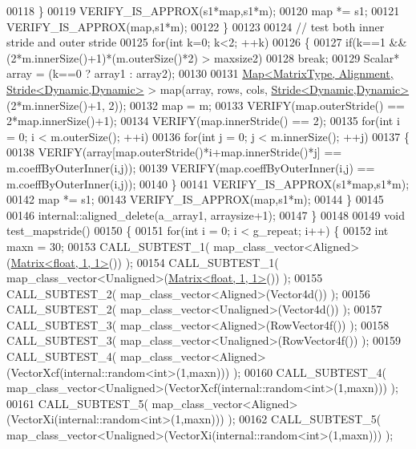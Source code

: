 \begin{DoxyCode}
00118       \}
00119     VERIFY\_IS\_APPROX(s1*map,s1*m);
00120     map *= s1;
00121     VERIFY\_IS\_APPROX(map,s1*m);
00122   \}
00123 
00124   \textcolor{comment}{// test both inner stride and outer stride}
00125   \textcolor{keywordflow}{for}(\textcolor{keywordtype}{int} k=0; k<2; ++k)
00126   \{
00127     \textcolor{keywordflow}{if}(k==1 && (2*m.innerSize()+1)*(m.outerSize()*2) > maxsize2)
00128       \textcolor{keywordflow}{break};
00129     Scalar* array = (k==0 ? array1 : array2);
00130     
00131     \hyperlink{group___core___module_class_eigen_1_1_map}{Map<MatrixType, Alignment, Stride<Dynamic,Dynamic>} > 
      map(array, rows, cols, \hyperlink{group___core___module_class_eigen_1_1_stride}{Stride<Dynamic,Dynamic>}(2*m.innerSize()+1, 2));
00132     map = m;
00133     VERIFY(map.outerStride() == 2*map.innerSize()+1);
00134     VERIFY(map.innerStride() == 2);
00135     \textcolor{keywordflow}{for}(\textcolor{keywordtype}{int} i = 0; i < m.outerSize(); ++i)
00136       \textcolor{keywordflow}{for}(\textcolor{keywordtype}{int} j = 0; j < m.innerSize(); ++j)
00137       \{
00138         VERIFY(array[map.outerStride()*i+map.innerStride()*j] == m.coeffByOuterInner(i,j));
00139         VERIFY(map.coeffByOuterInner(i,j) == m.coeffByOuterInner(i,j));
00140       \}
00141     VERIFY\_IS\_APPROX(s1*map,s1*m);
00142     map *= s1;
00143     VERIFY\_IS\_APPROX(map,s1*m);
00144   \}
00145 
00146   internal::aligned\_delete(a\_array1, arraysize+1);
00147 \}
00148 
00149 \textcolor{keywordtype}{void} test\_mapstride()
00150 \{
00151   \textcolor{keywordflow}{for}(\textcolor{keywordtype}{int} i = 0; i < g\_repeat; i++) \{
00152     \textcolor{keywordtype}{int} maxn = 30;
00153     CALL\_SUBTEST\_1( map\_class\_vector<Aligned>(\hyperlink{group___core___module_class_eigen_1_1_matrix}{Matrix<float, 1, 1>}()) );
00154     CALL\_SUBTEST\_1( map\_class\_vector<Unaligned>(\hyperlink{group___core___module_class_eigen_1_1_matrix}{Matrix<float, 1, 1>}()) );
00155     CALL\_SUBTEST\_2( map\_class\_vector<Aligned>(Vector4d()) );
00156     CALL\_SUBTEST\_2( map\_class\_vector<Unaligned>(Vector4d()) );
00157     CALL\_SUBTEST\_3( map\_class\_vector<Aligned>(RowVector4f()) );
00158     CALL\_SUBTEST\_3( map\_class\_vector<Unaligned>(RowVector4f()) );
00159     CALL\_SUBTEST\_4( map\_class\_vector<Aligned>(VectorXcf(internal::random<int>(1,maxn))) );
00160     CALL\_SUBTEST\_4( map\_class\_vector<Unaligned>(VectorXcf(internal::random<int>(1,maxn))) );
00161     CALL\_SUBTEST\_5( map\_class\_vector<Aligned>(VectorXi(internal::random<int>(1,maxn))) );
00162     CALL\_SUBTEST\_5( map\_class\_vector<Unaligned>(VectorXi(internal::random<int>(1,maxn))) );

\end{DoxyCode}
